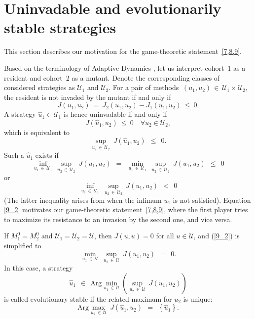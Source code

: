 \documentclass[11pt]{amsart}
\begin{document}
\section{Uninvadable and evolutionarily stable strategies}

This section describes our motivation for the game-theoretic statement~{\rm \cref{7,8,9}}.

Based on the terminology of Adaptive Dynamics \cite{DercoleRinaldi2008}, let us interpret cohort~{\rm 1} as a resident and
cohort~{\rm 2} as a mutant. Denote the corresponding classes of considered strategies as $ \mathcal{U}_1 $ and $ \mathcal{U}_2 $. For
a pair of methods $ \: (u_1, u_2) \, \in \, \mathcal{U}_1 \times \mathcal{U}_2, \: $ the resident is
not invaded by the mutant if and only if
$$
J(u_1, u_2) \: = \: J_2(u_1, u_2) - J_1(u_1, u_2) \: \leqslant \: 0.
$$
A strategy $ \hat{u}_1 \in \mathcal{U}_1 $ is hence uninvadable if and only if
$$
J \left( \hat{u}_1, u_2 \right) \: \leqslant \: 0 \quad \forall u_2 \in \mathcal{U}_2,
$$
which is equivalent to
$$
\sup_{u_2 \, \in \, \mathcal{U}_2} \: J \left( \hat{u}_1, u_2 \right) \:\: \leqslant \:\: 0.
$$
Such a $ \hat{u}_1 $ exists if
\begin{equation}
\inf_{u_1 \, \in \, \mathcal{U}_1} \: \sup_{u_2 \, \in \, \mathcal{U}_2} \: J(u_1, u_2) \:\: = \:\:
\min_{u_1 \, \in \, \mathcal{U}_1} \: \sup_{u_2 \, \in \, \mathcal{U}_2} \: J(u_1, u_2) \:\: \leqslant \:\: 0  \label{9_2}
\end{equation}
or
\begin{equation}
\inf_{u_1 \, \in \, \mathcal{U}_1} \: \sup_{u_2 \, \in \, \mathcal{U}_2} \: J(u_1, u_2) \:\: < \:\: 0  \label{9_4}
\end{equation}
(The latter inequality arises from when the infimum $u_1$ is not satisfied).
Equation \cref{9_2} motivates our game-theoretic statement~{\rm \cref{7,8,9},} where the first player tries to maximize its
resistance to an invasion by the second one{\rm ,} and vice versa.

If $ M_1^0 = M_2^0 $ and $ \mathcal{U}_1 = \mathcal{U}_2 = \mathcal{U} ${\rm ,} then $ J(u, u) = 0 $ for all $ u \in \mathcal{U} ${\rm ,}
and {\rm (\ref{9_2})} is simplified to
\begin{equation}
\min_{u_1 \, \in \, \mathcal{U}} \: \sup_{u_2 \, \in \, \mathcal{U}} \: J(u_1, u_2) \:\: = \:\: 0.  \label{9_3}
\end{equation}
In this case{\rm ,} a strategy
$$
\hat{u}_1 \:\: \in \:\: \mathrm{Arg} \min_{u_1 \, \in \, \mathcal{U}} \left( \sup_{u_2 \, \in \, \mathcal{U}} \: J(u_1, u_2) \right)
$$
is called evolutionary stable if the related maximum for $ u_2 $ is unique{\rm :}
$$
\mathrm{Arg} \max_{u_2 \, \in \, \mathcal{U}} \: J \left( \hat{u}_1, u_2 \right) \:\: = \:\: \left\{ \hat{u}_1 \right\}.
$$
\end{document}
